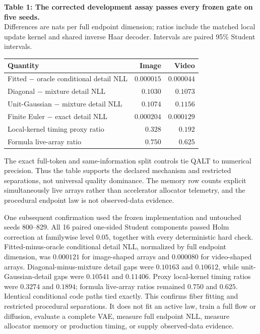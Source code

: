 \documentclass[11pt]{article}
\begin{document}
\begin{center}
\begin{minipage}{0.96\textwidth}
\centering
\small
\textbf{Table 1: The corrected development assay passes every frozen gate on five seeds.}\\
\vspace{2pt}
Differences are nats per full endpoint dimension; ratios include the matched local update kernel and shared inverse Haar decoder.  Intervals are paired 95\% Student intervals.\\[4pt]
\begin{tabular}{lrr}
\toprule
Quantity & Image & Video\\
\midrule
Fitted $-$ oracle conditional detail NLL & $0.000015$ & $0.000044$\\
Diagonal $-$ mixture detail NLL & $0.1030$ & $0.1073$\\
Unit-Gaussian $-$ mixture detail NLL & $0.1074$ & $0.1156$\\
Finite Euler $-$ exact detail NLL & $0.000204$ & $0.000129$\\
Local-kernel timing proxy ratio & $0.328$ & $0.192$\\
Formula live-array ratio & $0.750$ & $0.625$\\
\bottomrule
\end{tabular}
\end{minipage}
\end{center}

The exact full-token and same-information split controls tie QALT to numerical precision.  Thus the table supports the declared mechanism and restricted separations, not universal quality dominance.  The memory row counts explicit simultaneously live arrays rather than accelerator allocator telemetry, and the procedural endpoint law is not observed-data evidence.

One subsequent confirmation used the frozen implementation and untouched seeds 800--829.  All 16 paired one-sided Student components passed Holm correction at familywise level 0.05, together with every deterministic hard check.  Fitted-minus-oracle conditional detail NLL, normalized by full endpoint dimension, was $0.000121$ for image-shaped arrays and $0.000080$ for video-shaped arrays.  Diagonal-minus-mixture detail gaps were $0.10163$ and $0.10612$, while unit-Gaussian-detail gaps were $0.10541$ and $0.11406$.  Proxy local-kernel timing ratios were $0.3274$ and $0.1894$; formula live-array ratios remained $0.750$ and $0.625$.  Identical conditional code paths tied exactly.  This confirms fiber fitting and restricted procedural separations.  It does not fit an active law, train a full flow or diffusion, evaluate a complete VAE, measure full endpoint NLL, measure allocator memory or production timing, or supply observed-data evidence.
\end{document}
